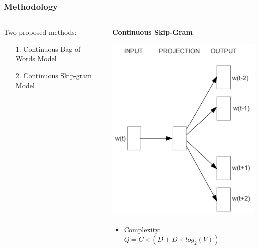 \documentclass[aspectratio=169]{beamer}
\begin{document}
\begin{frame}
\frametitle{Methodology}

\begin{columns}

\begin{column}{0.5\textwidth}
    Two proposed methods:

    \vskip 0.5in

    \begin{itemize}
        \item[1.] Continuous Bag-of-Words Model
        \item[2.] Continuous Skip-gram Model 
    \end{itemize}
\end{column}

\begin{column}{0.5\textwidth}

\begin{center}
    \textbf{Continuous Skip-Gram}
\end{center}

\begin{center}
\includegraphics[scale=0.35]{csg.png}
\end{center}

\begin{itemize}
    \item Complexity: $Q = C \times (D + D \times log_2(V))$ %
\end{itemize}

\end{column}

\end{columns}

\end{frame}
\end{document}
